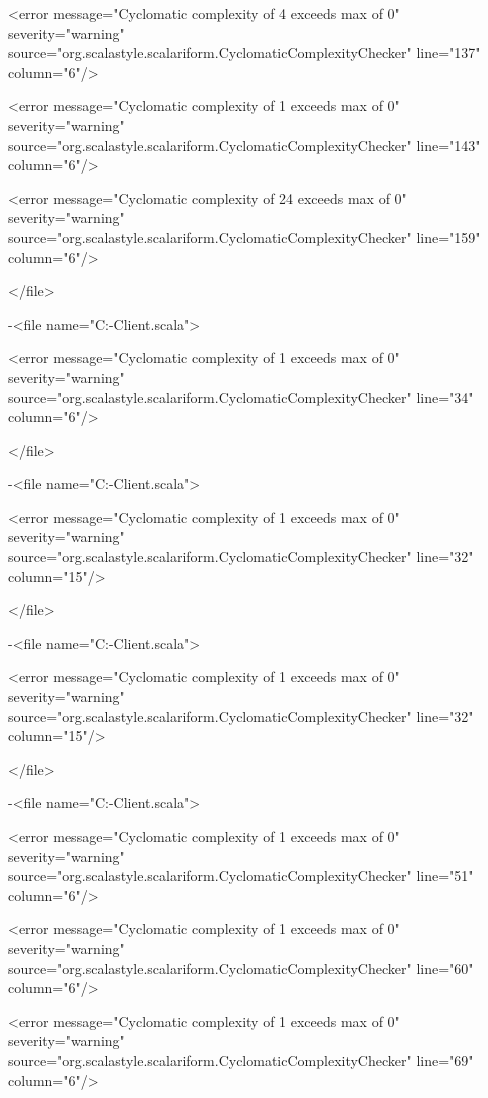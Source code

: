 \documentclass{scalatekids-article}
\begin{document}
<error message="Cyclomatic complexity of 4 exceeds max of 0" severity="warning" source="org.scalastyle.scalariform.CyclomaticComplexityChecker" line="137" column="6"/>

<error message="Cyclomatic complexity of 1 exceeds max of 0" severity="warning" source="org.scalastyle.scalariform.CyclomaticComplexityChecker" line="143" column="6"/>

<error message="Cyclomatic complexity of 24 exceeds max of 0" severity="warning" source="org.scalastyle.scalariform.CyclomaticComplexityChecker" line="159" column="6"/>

</file>


-<file name="C:\Users\Davide\Documents\GitHub\Actorbase-Client\src\main\scala\com\actorbase\cli\views\Observer.scala">

<error message="Cyclomatic complexity of 1 exceeds max of 0" severity="warning" source="org.scalastyle.scalariform.CyclomaticComplexityChecker" line="34" column="6"/>

</file>


-<file name="C:\Users\Davide\Documents\GitHub\Actorbase-Client\src\main\scala\com\actorbase\cli\models\RemoveItemCommand.scala">

<error message="Cyclomatic complexity of 1 exceeds max of 0" severity="warning" source="org.scalastyle.scalariform.CyclomaticComplexityChecker" line="32" column="15"/>

</file>


-<file name="C:\Users\Davide\Documents\GitHub\Actorbase-Client\src\main\scala\com\actorbase\cli\models\RemoveCollaboratorCommand.scala">

<error message="Cyclomatic complexity of 1 exceeds max of 0" severity="warning" source="org.scalastyle.scalariform.CyclomaticComplexityChecker" line="32" column="15"/>

</file>


-<file name="C:\Users\Davide\Documents\GitHub\Actorbase-Client\src\main\scala\com\actorbase\driver\client\Client.scala">

<error message="Cyclomatic complexity of 1 exceeds max of 0" severity="warning" source="org.scalastyle.scalariform.CyclomaticComplexityChecker" line="51" column="6"/>

<error message="Cyclomatic complexity of 1 exceeds max of 0" severity="warning" source="org.scalastyle.scalariform.CyclomaticComplexityChecker" line="60" column="6"/>

<error message="Cyclomatic complexity of 1 exceeds max of 0" severity="warning" source="org.scalastyle.scalariform.CyclomaticComplexityChecker" line="69" column="6"/>
\end{document}

